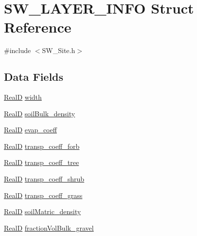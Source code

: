 \hypertarget{struct_s_w___l_a_y_e_r___i_n_f_o}{}\section{S\+W\+\_\+\+L\+A\+Y\+E\+R\+\_\+\+I\+N\+FO Struct Reference}
\label{struct_s_w___l_a_y_e_r___i_n_f_o}


{\ttfamily \#include $<$S\+W\+\_\+\+Site.\+h$>$}

\subsection*{Data Fields}
\begin{DoxyCompactItemize}
\item 
\hyperlink{generic_8h_af1c105fd5732f70b91ddaeda0cc340e3}{RealD} \hyperlink{struct_s_w___l_a_y_e_r___i_n_f_o_ab80d3d2ca7e78714d9a5dd0ecd9629c7}{width}
\item 
\hyperlink{generic_8h_af1c105fd5732f70b91ddaeda0cc340e3}{RealD} \hyperlink{struct_s_w___l_a_y_e_r___i_n_f_o_a964fdefe4cddfd0c0bb1fc287a358b0d}{soil\+Bulk\+\_\+density}
\item 
\hyperlink{generic_8h_af1c105fd5732f70b91ddaeda0cc340e3}{RealD} \hyperlink{struct_s_w___l_a_y_e_r___i_n_f_o_a271baacc4ff6a932df8965f964cd1660}{evap\+\_\+coeff}
\item 
\hyperlink{generic_8h_af1c105fd5732f70b91ddaeda0cc340e3}{RealD} \hyperlink{struct_s_w___l_a_y_e_r___i_n_f_o_acffa0e7788302bae3e54286438f3d4d2}{transp\+\_\+coeff\+\_\+forb}
\item 
\hyperlink{generic_8h_af1c105fd5732f70b91ddaeda0cc340e3}{RealD} \hyperlink{struct_s_w___l_a_y_e_r___i_n_f_o_ad2082cfae8f7bf7e2d82a98e8cf79f8e}{transp\+\_\+coeff\+\_\+tree}
\item 
\hyperlink{generic_8h_af1c105fd5732f70b91ddaeda0cc340e3}{RealD} \hyperlink{struct_s_w___l_a_y_e_r___i_n_f_o_a2b233d5220b02ca94343cb98a947e316}{transp\+\_\+coeff\+\_\+shrub}
\item 
\hyperlink{generic_8h_af1c105fd5732f70b91ddaeda0cc340e3}{RealD} \hyperlink{struct_s_w___l_a_y_e_r___i_n_f_o_a025d80ebe5697358bfbce56e95e99f17}{transp\+\_\+coeff\+\_\+grass}
\item 
\hyperlink{generic_8h_af1c105fd5732f70b91ddaeda0cc340e3}{RealD} \hyperlink{struct_s_w___l_a_y_e_r___i_n_f_o_a70e2dd5ecdf2da74460d1eb053ab7933}{soil\+Matric\+\_\+density}
\item 
\hyperlink{generic_8h_af1c105fd5732f70b91ddaeda0cc340e3}{RealD} \hyperlink{struct_s_w___l_a_y_e_r___i_n_f_o_a15d47245fb784af757e13df1485705e6}{fraction\+Vol\+Bulk\+\_\+gravel}

\end{DoxyCompactItemize}
